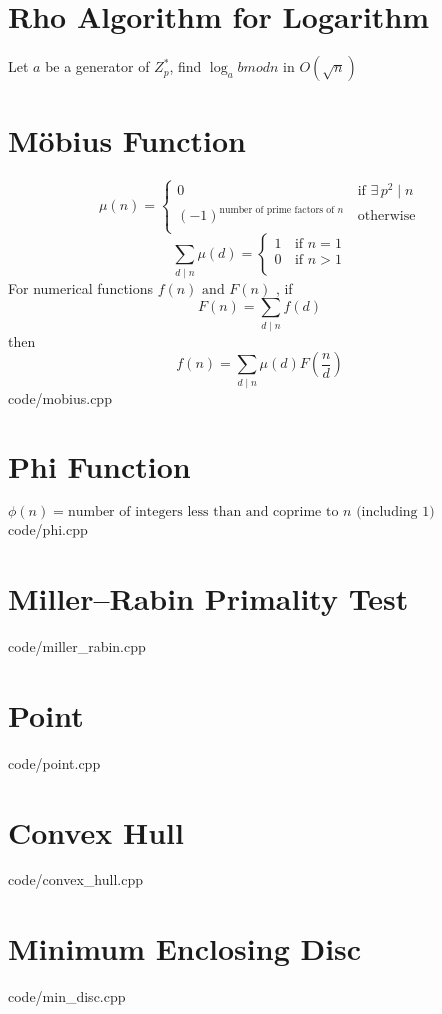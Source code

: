 \documentclass [landscape,8pt,a4paper,twocolumn]{article}
\begin{document}
\section{Rho Algorithm for Logarithm}
Let $ a $ be a generator of $ Z_{p}^{*} $, find $ \log_{a}{b} mod n $ in $ O(\sqrt{n}) $

\section{Möbius Function}
\[\mu (n) =
 	\begin{cases}
		0	& \, \text{if } \exists \, p^2 \mid n \\
		(-1)^{\text{number of prime factors of } n}	& \, \text{otherwise} \\
	\end{cases}
\]
\[\sum_{d \mid n} \mu(d) =
	\begin{cases}
    	1	& \, \text{if } n=1 \\
        0	& \, \text{if } n>1 \\
	\end{cases}
\]
For numerical functions $ f(n) \text{ and } F(n) $ , if
\[
	F(n)=\sum_{d \mid n}f(d)
\]
then
\[
	f(n)=\sum_{d \mid n}\mu(d)F(\frac{n}{d})
\]
 {code/mobius.cpp}

\section{Phi Function}
$ \phi(n)= \text{number of integers less than and coprime to } n \text{ (including } 1) $
 {code/phi.cpp}

\section{Miller–Rabin Primality Test}
 {code/miller_rabin.cpp}

\section{Point}
 {code/point.cpp}

\section{Convex Hull}
 {code/convex_hull.cpp}

\section{Minimum Enclosing Disc}
 {code/min_disc.cpp}
\end{document}
